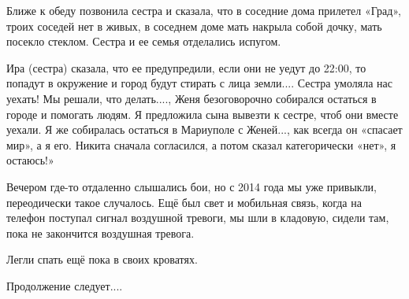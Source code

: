 Ближе к обеду позвонила сестра и сказала, что в соседние дома прилетел «Град»,
троих соседей нет в живых, в соседнем доме мать накрыла собой дочку, мать
посекло стеклом. Сестра и ее семья отделались испугом.

Ира (сестра) сказала, что ее предупредили, если они не уедут до 22:00, то
попадут в окружение и город будут стирать с лица земли.... Сестра умоляла нас
уехать! Мы решали, что делать...., Женя безоговорочно собирался остаться в городе
и помогать людям. Я предложила сына вывезти к сестре, чтоб они вместе уехали. Я
же собиралась остаться в Мариуполе с Женей..., как всегда он «спасает мир», а я
его. Никита сначала согласился, а потом сказал категорически «нет», я остаюсь!»

Вечером где-то отдаленно слышались бои, но с 2014 года мы уже привыкли,
переодически такое случалось. Ещё был свет и мобильная связь, когда на телефон
поступал сигнал воздушной тревоги, мы шли в кладовую, сидели там, пока не
закончится воздушная тревога. 

Легли спать ещё пока в своих кроватях. 

Продолжение следует....
